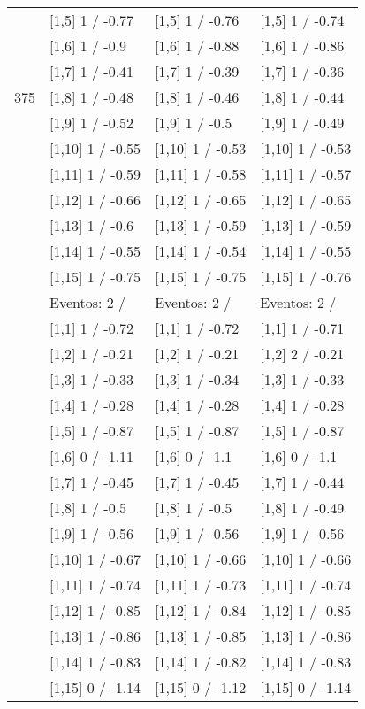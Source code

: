 \begin{table}
\begin{tabular}[t]{llll}
 & {}[1,5] 1  / -0.77 & {}[1,5] 1  / -0.76 & {}[1,5] 1  / -0.74\\
 & {}[1,6] 1  / -0.9 & {}[1,6] 1  / -0.88 & {}[1,6] 1  / -0.86\\
 & {}[1,7] 1  / -0.41 & {}[1,7] 1  / -0.39 & {}[1,7] 1  / -0.36\\
375 & {}[1,8] 1  / -0.48 & {}[1,8] 1  / -0.46 & {}[1,8] 1  / -0.44\\
\addlinespace
 & {}[1,9] 1  / -0.52 & {}[1,9] 1  / -0.5 & {}[1,9] 1  / -0.49\\
 & {}[1,10] 1  / -0.55 & {}[1,10] 1  / -0.53 & {}[1,10] 1  / -0.53\\
 & {}[1,11] 1  / -0.59 & {}[1,11] 1  / -0.58 & {}[1,11] 1  / -0.57\\
 & {}[1,12] 1  / -0.66 & {}[1,12] 1  / -0.65 & {}[1,12] 1  / -0.65\\
 & {}[1,13] 1  / -0.6 & {}[1,13] 1  / -0.59 & {}[1,13] 1  / -0.59\\
\addlinespace
 & {}[1,14] 1  / -0.55 & {}[1,14] 1  / -0.54 & {}[1,14] 1  / -0.55\\
 & {}[1,15] 1  / -0.75 & {}[1,15] 1  / -0.75 & {}[1,15] 1  / -0.76\\
 & Eventos:  2 / & Eventos:  2 / & Eventos:  2 /\\
 & {}[1,1] 1  / -0.72 & {}[1,1] 1  / -0.72 & {}[1,1] 1  / -0.71\\
 & {}[1,2] 1  / -0.21 & {}[1,2] 1  / -0.21 & {}[1,2] 2  / -0.21\\
\addlinespace
 & {}[1,3] 1  / -0.33 & {}[1,3] 1  / -0.34 & {}[1,3] 1  / -0.33\\
 & {}[1,4] 1  / -0.28 & {}[1,4] 1  / -0.28 & {}[1,4] 1  / -0.28\\
 & {}[1,5] 1  / -0.87 & {}[1,5] 1  / -0.87 & {}[1,5] 1  / -0.87\\
 & {}[1,6] 0  / -1.11 & {}[1,6] 0  / -1.1 & {}[1,6] 0  / -1.1\\
 & {}[1,7] 1  / -0.45 & {}[1,7] 1  / -0.45 & {}[1,7] 1  / -0.44\\
\addlinespace
500 & {}[1,8] 1  / -0.5 & {}[1,8] 1  / -0.5 & {}[1,8] 1  / -0.49\\
 & {}[1,9] 1  / -0.56 & {}[1,9] 1  / -0.56 & {}[1,9] 1  / -0.56\\
 & {}[1,10] 1  / -0.67 & {}[1,10] 1  / -0.66 & {}[1,10] 1  / -0.66\\
 & {}[1,11] 1  / -0.74 & {}[1,11] 1  / -0.73 & {}[1,11] 1  / -0.74\\
 & {}[1,12] 1  / -0.85 & {}[1,12] 1  / -0.84 & {}[1,12] 1  / -0.85\\
\addlinespace
 & {}[1,13] 1  / -0.86 & {}[1,13] 1  / -0.85 & {}[1,13] 1  / -0.86\\
 & {}[1,14] 1  / -0.83 & {}[1,14] 1  / -0.82 & {}[1,14] 1  / -0.83\\
 & {}[1,15] 0  / -1.14 & {}[1,15] 0  / -1.12 & {}[1,15] 0  / -1.14\\
\bottomrule
\end{tabular}
\end{table}
